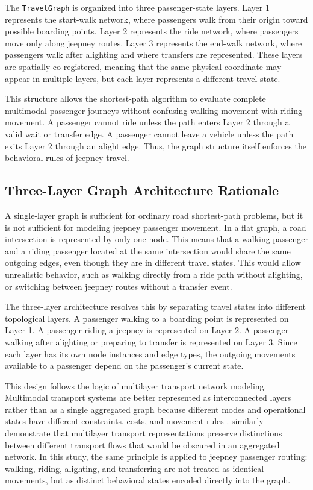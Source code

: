 {{The \texttt{TravelGraph} is organized into three passenger-state layers. Layer 1 represents the start-walk network, where passengers walk from their origin toward possible boarding points. Layer 2 represents the ride network, where passengers move only along jeepney routes. Layer 3 represents the end-walk network, where passengers walk after alighting and where transfers are represented. These layers are spatially co-registered, meaning that the same physical coordinate may appear in multiple layers, but each layer represents a different travel state.

This structure allows the shortest-path algorithm to evaluate complete multimodal passenger journeys without confusing walking movement with riding movement. A passenger cannot ride unless the path enters Layer 2 through a valid wait or transfer edge. A passenger cannot leave a vehicle unless the path exits Layer 2 through an alight edge. Thus, the graph structure itself enforces the behavioral rules of jeepney travel.

\subsection{Three-Layer Graph Architecture Rationale}
A single-layer graph is sufficient for ordinary road shortest-path problems, but it is not sufficient for modeling jeepney passenger movement. In a flat graph, a road intersection is represented by only one node. This means that a walking passenger and a riding passenger located at the same intersection would share the same outgoing edges, even though they are in different travel states. This would allow unrealistic behavior, such as walking directly from a ride path without alighting, or switching between jeepney routes without a transfer event.

The three-layer architecture resolves this by separating travel states into different topological layers. A passenger walking to a boarding point is represented on Layer 1. A passenger riding a jeepney is represented on Layer 2. A passenger walking after alighting or preparing to transfer is represented on Layer 3. Since each layer has its own node instances and edge types, the outgoing movements available to a passenger depend on the passenger's current state.

This design follows the logic of multilayer transport network modeling. Multimodal transport systems are better represented as interconnected layers rather than as a single aggregated graph because different modes and operational states have different constraints, costs, and movement rules \citep{alessandretti2023multimodal}. \cite{peng2023multi} similarly demonstrate that multilayer transport representations preserve distinctions between different transport flows that would be obscured in an aggregated network. In this study, the same principle is applied to jeepney passenger routing: walking, riding, alighting, and transferring are not treated as identical movements, but as distinct behavioral states encoded directly into the graph.

}}
